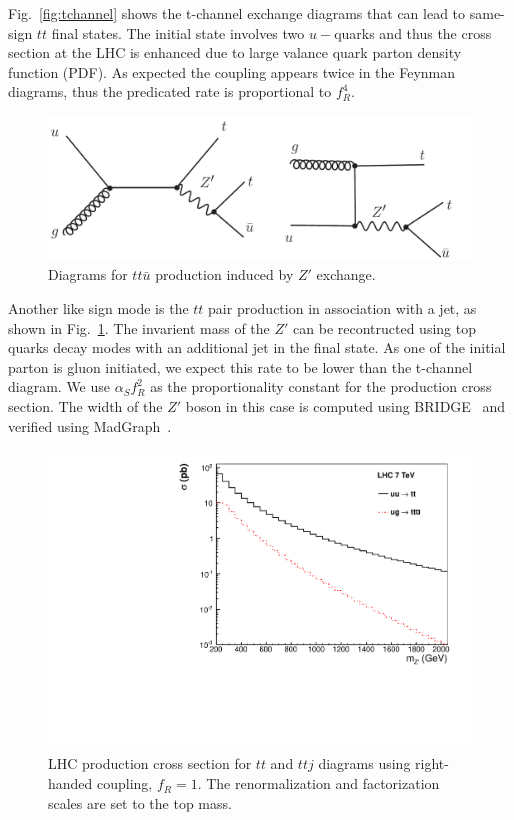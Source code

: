 Fig.~\ref{fig:tchannel} shows the t-channel exchange diagrams that can lead to same-sign $tt$ final states. The initial
state involves two $u-$quarks and thus the cross section at the LHC is enhanced due to large valance quark parton 
density function (PDF). As expected the coupling appears twice in the Feynman diagrams, thus the predicated rate 
is proportional to $f_R^4$. 

\begin{figure}[htb]
\begin{center}
\includegraphics[width=0.7\linewidth, height=0.25\linewidth]{figs/sstop2.pdf}
\caption{ Diagrams for $tt\bar{u}$ production induced by $Z'$ exchange. \label{fig:schannel}}
\end{center}
\end{figure}

Another like sign mode is the $tt$ pair production in association with a jet, as shown 
in Fig.~\ref{fig:schannel}. The invarient mass of the $Z'$ can be recontructed using 
top quarks decay modes with an additional jet in the final state. As one of the initial parton is gluon initiated, 
we expect this rate to be lower than the t-channel diagram. We use $\alpha_Sf_R^2$ as the proportionality 
constant for the production cross section. The width of the $Z'$ boson in this case is computed using 
BRIDGE~\cite{bridge} and verified using MadGraph~\cite{madgraph}. 

\begin{figure}[htb]
\begin{center}
\includegraphics[width=0.7\linewidth]{figs/sstopcross.pdf}
\caption{ LHC production cross section for $tt$ and $ttj$ diagrams using right-handed coupling, $f_R = 1$. 
The renormalization and factorization scales are set to the top mass. \label{fig:sstopcross}}
\end{center}
\end{figure}

